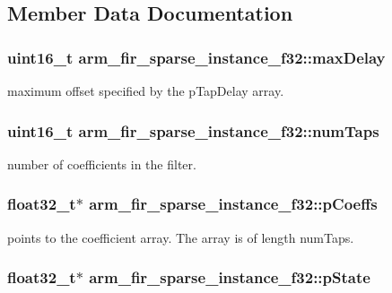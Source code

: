 \subsection{Member Data Documentation}
\hypertarget{structarm__fir__sparse__instance__f32_af8b8c775f4084c36774f06c082b4c078}{
\subsubsection[{max\-Delay}]{\setlength{\rightskip}{0pt plus 5cm}uint16\-\_\-t arm\-\_\-fir\-\_\-sparse\-\_\-instance\-\_\-f32\-::max\-Delay}}\label{structarm__fir__sparse__instance__f32_af8b8c775f4084c36774f06c082b4c078}
maximum offset specified by the p\-Tap\-Delay array. \hypertarget{structarm__fir__sparse__instance__f32_a5e19e7f234ac30a3db843352bf2a8515}{
\subsubsection[{num\-Taps}]{\setlength{\rightskip}{0pt plus 5cm}uint16\-\_\-t arm\-\_\-fir\-\_\-sparse\-\_\-instance\-\_\-f32\-::num\-Taps}}\label{structarm__fir__sparse__instance__f32_a5e19e7f234ac30a3db843352bf2a8515}
number of coefficients in the filter. \hypertarget{structarm__fir__sparse__instance__f32_a04af7c738dfb0882ad102fcad501d94a}{
\subsubsection[{p\-Coeffs}]{\setlength{\rightskip}{0pt plus 5cm}float32\-\_\-t$\ast$ arm\-\_\-fir\-\_\-sparse\-\_\-instance\-\_\-f32\-::p\-Coeffs}}\label{structarm__fir__sparse__instance__f32_a04af7c738dfb0882ad102fcad501d94a}
points to the coefficient array. The array is of length num\-Taps. \hypertarget{structarm__fir__sparse__instance__f32_a794af0916666d11cc564d6df08553555}{
\subsubsection[{p\-State}]{\setlength{\rightskip}{0pt plus 5cm}float32\-\_\-t$\ast$ arm\-\_\-fir\-\_\-sparse\-\_\-instance\-\_\-f32\-::p\-State}}\label{structarm__fir__sparse__instance__f32_a794af0916666d11cc564d6df08553555}
